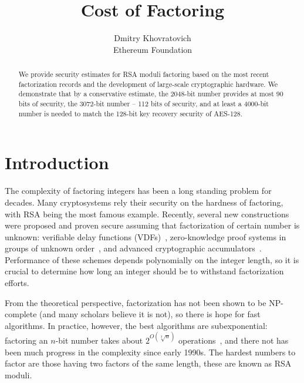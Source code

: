 \documentclass[a4paper]{article}
\title{Cost of Factoring}
\author{Dmitry Khovratovich\\Ethereum Foundation}
\begin{document}
\maketitle

\begin{abstract}
    We provide security estimates for RSA moduli factoring based on the most recent factorization records and the development of large-scale cryptographic hardware. We demonstrate that by a conservative estimate, the 2048-bit number provides at most 90 bits of security, the 3072-bit number -- 112 bits of security, and at least a 4000-bit number is needed to match the 128-bit key recovery security of AES-128. 
\end{abstract}

\section{Introduction}

The complexity of factoring integers has been a long standing problem for decades. Many cryptosystems rely their security on the hardness of factoring, with RSA being the most famous example. Recently, several new constructions were  proposed and proven  secure assuming that factorization of certain number is unknown: verifiable delay functions (VDFs)~\cite{DBLP:conf/eurocrypt/Wesolowski19,DBLP:conf/crypto/BonehBBF18}, zero-knowledge proof systems in groups of unknown order~\cite{cryptoeprint:2019:1229}, and advanced cryptographic accumulators~\cite{cryptoeprint:2019:1494}. Performance of these schemes depends polynomially on the integer length, so it is crucial to determine how long an integer should be to withstand factorization efforts.

From the theoretical perspective, factorization has not been shown to be NP-complete (and many scholars believe it is not), so there is hope for fast algorithms. In practice, however, the best algorithms are subexponential: factoring an $n$-bit number takes about $2^{O(\sqrt[3]{n})}$ operations~\cite{lenstra1993development}, and there not has been much progress in the complexity since early 1990s. The hardest numbers to factor are those having two factors of the same length, these are known as RSA moduli.
\end{document}
